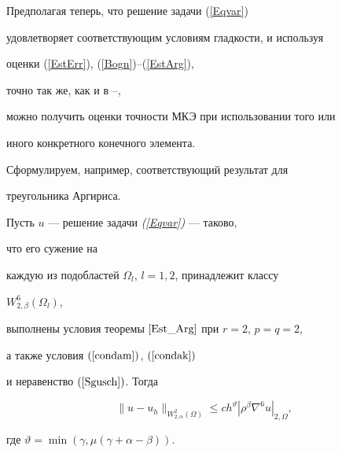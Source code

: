 Предполагая теперь, что решение задачи (\ref{Eqvar}) 


удовлетворяет соответствующим условиям гладкости, и используя 


оценки (\ref{EstErr}), (\ref{Bogn})--(\ref{EstArg}), 


точно так же, как и в \cite{Ljash93}--\cite{Timer94}, 


можно получить оценки точности МКЭ при использовании того или 


иного конкретного конечного элемента.


Сформулируем, например, соответствующий результат для 


треугольника Аргириса.





\begin{thm} \label{Arg_FEM}


Пусть $u$ --- решение задачи {\em (\ref{Eqvar})} --- таково,


что его сужение на 


каждую из подобластей $\Omega_l$, $l=1,2$, принадлежит классу


$W_{2,\beta }^6( \Omega_l )$,


выполнены условия теоремы $\ref{Est_Arg}$ при $ r=2$, $p=q=2 $, 


а также условия $(\ref{condam})$, $(\ref{condak})$


и неравенство $(\ref{Sgusch})$. Тогда 


$$


\| {u-u_h} \|_{W_{2,\alpha }^2( \Omega )}\le 


ch^\vartheta | {\rho ^\beta \nabla ^6u} |_{2,\Omega },


$$


где $\vartheta = \min (\gamma, \mu(\gamma + \alpha - \beta))$.


\end{thm}











